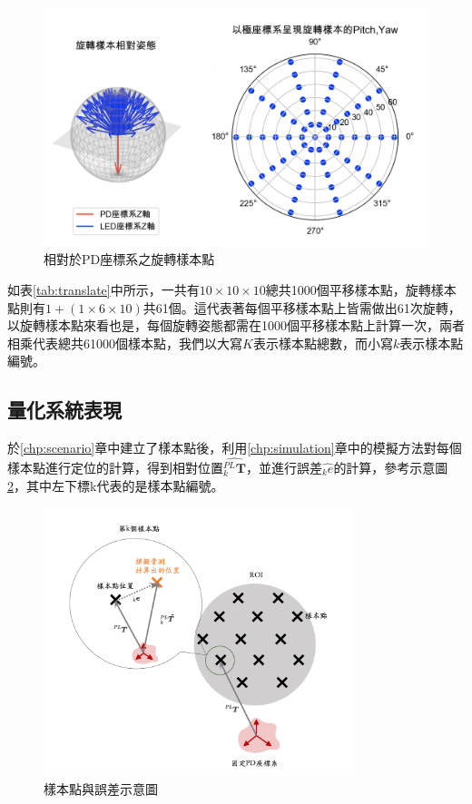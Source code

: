 \begin{figure}[htpb]
    \centering
    \includegraphics[width=12cm]{ch4pic/rotate_sample.png}
    \caption{相對於PD座標系之旋轉樣本點}
    \label{pic:rotate_sample}
\end{figure}


如表\ref{tab:translate}中所示，一共有$10\times 10\times 10$總共1000個平移樣本點，旋轉樣本點則有$1+(1\times 6\times 10)$共61個。這代表著每個平移樣本點上皆需做出61次旋轉，以旋轉樣本點來看也是，每個旋轉姿態都需在1000個平移樣本點上計算一次，兩者相乘代表總共61000個樣本點，我們以大寫$K$表示樣本點總數，而小寫$k$表示樣本點編號。






\subsection{量化系統表現}
\label{chp:evaluate_method}

於\ref{chp:scenario}章中建立了樣本點後，利用\ref{chp:simulation}章中的模擬方法對每個樣本點進行定位的計算，得到相對位置$\hat{_k^{PL}\boldsymbol{T}}$，並進行誤差$\hat{_k e}$的計算，參考示意圖\ref{pic:error_show}，其中左下標k代表的是樣本點編號。

\begin{figure}[htpb]
    \centering
    \includegraphics[width=9cm]{ch4pic/error.png}
    \caption{樣本點與誤差示意圖}
    \label{pic:error_show}
\end{figure}

